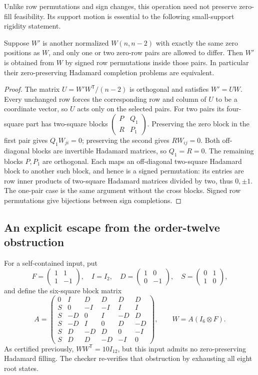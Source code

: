 Unlike row permutations and sign changes, this operation need not
preserve zero-fill feasibility. Its support motion is essential to
the following small-support rigidity statement.

\begin{proposition}
Suppose $W'$ is another normalized $W(n,n-2)$ with exactly the same
zero positions as $W$, and only one or two zero-row pairs are allowed
to differ. Then $W'$ is obtained from $W$ by signed row permutations
inside those pairs. In particular their zero-preserving Hadamard
completion problems are equivalent.
\end{proposition}
\begin{proof}
The matrix $U=W'W^{\mathsf T}/(n-2)$ is orthogonal and satisfies
$W'=UW$. Every unchanged row forces the corresponding row and
column of $U$ to be a coordinate vector, so $U$ acts only on the
selected pairs. For two pairs its four-square part has two-square
blocks $\left(\begin{smallmatrix}P&Q_1\\R&P_1\end{smallmatrix}\right)$.
Preserving the zero block in the first pair gives
$Q_1W_{ji}=0$; preserving the second gives $RW_{ij}=0$.
Both off-diagonal blocks are invertible Hadamard matrices, so
$Q_1=R=0$. The remaining blocks $P,P_1$ are orthogonal. Each maps
an off-diagonal two-square Hadamard block to another such block,
and hence is a signed permutation: its entries are row inner products
of two-square Hadamard matrices divided by two, thus $0,\pm1$.
The one-pair case is the same argument without the cross blocks.
Signed row permutations give bijections between sign completions.
\end{proof}

\subsection{An explicit escape from the order-twelve obstruction}
For a self-contained input, put
\[
 F=\begin{pmatrix}1&1\\1&-1\end{pmatrix},\quad
 I=I_2,\quad D=\begin{pmatrix}1&0\\0&-1\end{pmatrix},\quad
 S=\begin{pmatrix}0&1\\1&0\end{pmatrix},
\]
and define the six-square block matrix
\[
 A=\begin{pmatrix}
0&I&D&D&D&D\\S&0&-I&-I&I&I\\S&-D&0&I&-D&D\\
S&-D&I&0&D&-D\\S&D&-D&D&0&-I\\S&D&D&-D&-I&0
\end{pmatrix},\qquad W=A(I_6\otimes F).
\]
As certified previously, $WW^{\mathsf T}=10I_{12}$, but this input
admits no zero-preserving Hadamard filling. The checker re-verifies
that obstruction by exhausting all eight root states.

